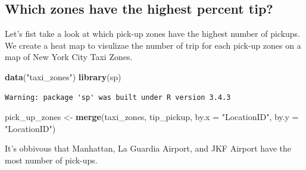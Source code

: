 \documentclass[12pt,twoside]{reedthesis}
\newenvironment{Shaded}{\begin{snugshade}}{\end{snugshade}}
\newcommand{\KeywordTok}[1]{\textcolor[rgb]{0.13,0.29,0.53}{\textbf{#1}}}
\newcommand{\DataTypeTok}[1]{\textcolor[rgb]{0.13,0.29,0.53}{#1}}
\newcommand{\StringTok}[1]{\textcolor[rgb]{0.31,0.60,0.02}{#1}}
\newcommand{\CommentTok}[1]{\textcolor[rgb]{0.56,0.35,0.01}{\textit{#1}}}
\newcommand{\OtherTok}[1]{\textcolor[rgb]{0.56,0.35,0.01}{#1}}
\newcommand{\NormalTok}[1]{#1}
\theoremstyle{definition}
\theoremstyle{definition}
\theoremstyle{definition}
\theoremstyle{remark}
\begin{document}
\subsection{Which zones have the highest percent
tip?}\label{which-zones-have-the-highest-percent-tip}

Let's fist take a look at which pick-up zones have the highest number of
pickups. We create a heat map to visulizae the number of trip for each
pick-up zones on a map of New York City Taxi Zones.
\begin{Shaded}
\begin{Highlighting}[]
\KeywordTok{data}\NormalTok{(}\StringTok{"taxi_zones"}\NormalTok{)}
\KeywordTok{library}\NormalTok{(sp)}
\end{Highlighting}
\end{Shaded}
\begin{verbatim}
Warning: package 'sp' was built under R version 3.4.3
\end{verbatim}
\begin{Shaded}
\begin{Highlighting}[]
\NormalTok{pick_up_zones <-}\StringTok{ }\KeywordTok{merge}\NormalTok{(taxi_zones, tip_pickup, }\DataTypeTok{by.x =} \StringTok{"LocationID"}\NormalTok{, }
    \DataTypeTok{by.y =} \StringTok{"LocationID"}\NormalTok{)}
\end{Highlighting}
\end{Shaded}
\begin{Shaded}
\end{Shaded}
It's obbivous that Manhattan, La Guardia Airport, and JKF Airport have
the most number of pick-ups.
\end{document}

